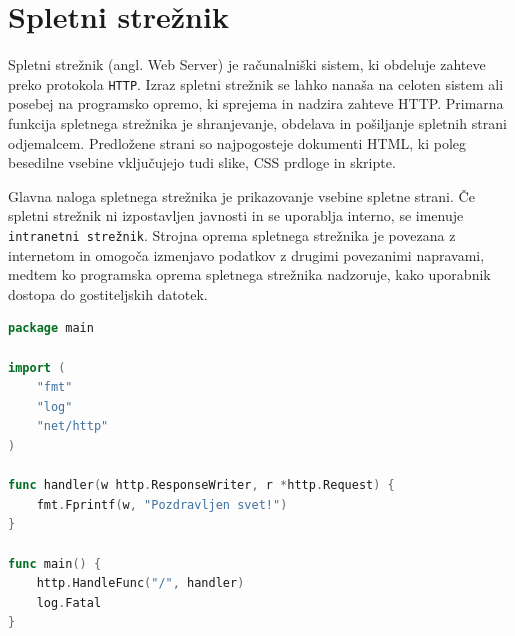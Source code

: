 \documentclass[a4paper, 12pt]{book}
\begin{document}


\section{Spletni strežnik}

Spletni strežnik (angl. Web Server) je računalniški sistem, ki obdeluje zahteve preko protokola \verb=HTTP=. Izraz spletni strežnik se lahko nanaša na celoten sistem ali posebej na programsko opremo, ki sprejema in nadzira zahteve HTTP. Primarna funkcija spletnega strežnika je shranjevanje, obdelava in pošiljanje spletnih strani odjemalcem. Predložene strani so najpogosteje dokumenti HTML, ki poleg besedilne vsebine vključujejo tudi slike, CSS prdloge in skripte. 

Glavna naloga spletnega strežnika je prikazovanje vsebine spletne strani. Če spletni strežnik ni izpostavljen javnosti in se uporablja interno, se imenuje \verb=intranetni strežnik=. Strojna oprema spletnega strežnika je povezana z internetom in omogoča izmenjavo podatkov z drugimi povezanimi napravami, medtem ko programska oprema spletnega strežnika nadzoruje, kako uporabnik dostopa do gostiteljskih datotek.

\begin{lstlisting}[language=go, style=mystyle,caption={Spletni strežnik v programskem jeziku Go},label=lst:ws-go]
package main

import (
    "fmt"
    "log"
    "net/http"
)

func handler(w http.ResponseWriter, r *http.Request) {
    fmt.Fprintf(w, "Pozdravljen svet!")
}

func main() {
    http.HandleFunc("/", handler)
    log.Fatal
}
\end{lstlisting}
\end{document}
